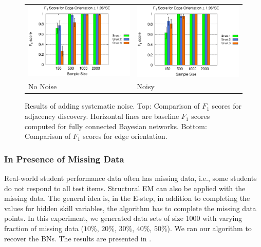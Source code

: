 \documentclass{edm_template}
\begin{document}
{\begin{figure}
\begin{center}
\begin{tabular}{>{\centering}m{1.5in} >{\centering\arraybackslash}m{1.5in}}
				\includegraphics[width=1.1\linewidth]{figures/F1O_single.eps} &\includegraphics[width=1.1\linewidth]{figures/F1O_single_noisy.eps}\\
				No Noise & Noisy
			\end{tabular}
		\end{center}
		\caption{Results of adding systematic noise. Top: Comparison of $F_1$ scores for adjacency discovery. Horizontal lines are baseline $F_1$ scores computed for fully connected Bayesian networks. Bottom: Comparison of $F_1$ scores for edge orientation. }
		\label{fig:f1-noisy} 
	\end{figure}
	
	\subsubsection{In Presence of Missing Data}
	Real-world student performance data often has missing data, i.e., some students do not respond to all test items. Structural EM can also be applied with the missing data. 
	The general idea is, in the E-step, in addition to completing the values for hidden skill variables, the algorithm has to complete the missing data points.
	In this experiment, we generated data sets of size 1000 with varying fraction of missing data ($10\%$, $20\%$, $30\%$, $40\%$, $50\%$).
	We ran our algorithm to recover the BNs. The results are presented in .
	
}
\end{document}
